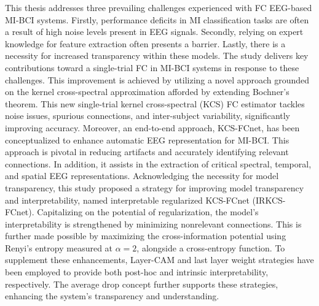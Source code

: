 This thesis addresses three prevailing challenges experienced with FC EEG-based MI-BCI systems. Firstly, performance deficits in MI classification tasks are often a result of high noise levels present in EEG signals. Secondly, relying on expert knowledge for feature extraction often presents a barrier. Lastly, there is a necessity for increased transparency within these models. The study delivers key contributions toward a single-trial FC in MI-BCI systems in response to these challenges. This improvement is achieved by utilizing a novel approach grounded on the kernel cross-spectral approximation afforded by extending Bochner's theorem. This new single-trial kernel cross-spectral (KCS) FC estimator tackles noise issues, spurious connections, and inter-subject variability, significantly improving accuracy. Moreover, an end-to-end approach, KCS-FCnet, has been conceptualized to enhance automatic EEG representation for MI-BCI. This approach is pivotal in reducing artifacts and accurately identifying relevant connections. In addition, it assists in the extraction of critical spectral, temporal, and spatial EEG representations. Acknowledging the necessity for model transparency, this study proposed a strategy for improving model transparency and interpretability, named interpretable regularized KCS-FCnet (IRKCS-FCnet). Capitalizing on the potential of regularization, the model's interpretability is strengthened by minimizing nonrelevant connections. This is further made possible by maximizing the cross-information potential using Renyi's entropy measured at $\alpha=2$, alongside a cross-entropy function. To supplement these enhancements, Layer-CAM and last layer weight strategies have been employed to provide both post-hoc and intrinsic interpretability, respectively. The average drop concept further supports these strategies, enhancing the system's transparency and understanding.

